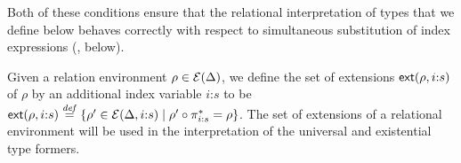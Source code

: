 Both of these conditions ensure that the relational interpretation of
types that we define below behaves correctly with respect to
simultaneous substitution of index expressions
(, below).




Given a relation environment $\rho \in \mathcal{E}(\Delta)$, we define
the set of extensions $\mathsf{ext}(\rho,i\mathord:s)$ of $\rho$ by an
additional index variable $i\mathord:s$ to be
$\mathsf{ext}(\rho,i\mathord:s) \stackrel{\mathit{def}}= \{ \rho' \in
\mathcal{E}(\Delta,i\mathord:s) \mathrel| \rho' \circ \pi^*_{i\mathord:s}
= \rho \}$. The set of extensions of a relational environment will be
used in the interpretation of the universal and existential type
formers.


